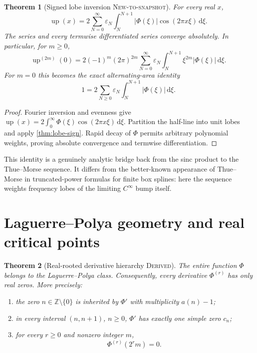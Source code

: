 \documentclass[11pt,oneside]{article}
\numberwithin{equation}{section}
\newtheorem{theorem}{Theorem}[section]
\theoremstyle{definition}
\theoremstyle{remark}
\newcommand{\Z}{\mathbb Z}
\newcommand{\dd}{\,\mathrm d}
\newcommand{\Up}{\operatorname{up}}
\newcommand{\Derived}{\textsc{Derived}}
\newcommand{\NewResult}{\textsc{New-to-snapshot}}
\begin{document}
\begin{theorem}[Signed lobe inversion \NewResult]
\label{thm:lobe-inversion}
For every real $x$,
\begin{equation}
 \Up(x)=2\sum_{N=0}^{\infty}\varepsilon_N
 \int_N^{N+1}|\Phi(\xi)|\cos(2\pi x\xi)\dd\xi.             \label{eq:lobe-inversion}
\end{equation}
The series and every termwise differentiated series converge absolutely.  In
particular, for $m\ge0$,
\begin{equation}
 \Up^{(2m)}(0)=2(-1)^m(2\pi)^{2m}
 \sum_{N=0}^{\infty}\varepsilon_N
 \int_N^{N+1}\xi^{2m}|\Phi(\xi)|\dd\xi.                  \label{eq:lobe-moments}
\end{equation}
For $m=0$ this becomes the exact alternating-area identity
\begin{equation}
 1=2\sum_{N\ge0}\varepsilon_N\int_N^{N+1}|\Phi(\xi)|\dd\xi.                \label{eq:area}
\end{equation}
\end{theorem}

\begin{proof}
Fourier inversion and evenness give
$\Up(x)=2\int_0^\infty\Phi(\xi)\cos(2\pi x\xi)\dd\xi$.
Partition the half-line into unit lobes and apply \cref{thm:lobe-sign}.
Rapid decay of $\Phi$ permits arbitrary polynomial weights, proving absolute
convergence and termwise differentiation.
\end{proof}

This identity is a genuinely analytic bridge back from the sinc product to the
Thue--Morse sequence.  It differs from the better-known appearance of
Thue--Morse in truncated-power formulas for finite box splines: here the sequence
weights frequency lobes of the limiting $C^\infty$ bump itself.

\section{Laguerre--Polya geometry and real critical points}
\label{sec:LP}

\begin{theorem}[Real-rooted derivative hierarchy \Derived]
\label{thm:LP}
The entire function $\Phi$ belongs to the Laguerre--Polya class.  Consequently,
every derivative $\Phi^{(r)}$ has only real zeros.  More precisely:
\begin{enumerate}
\item the zero $n\in\Z\setminus\{0\}$ is inherited by $\Phi'$ with multiplicity
      $a(n)-1$;
\item in every interval $(n,n+1)$, $n\ge0$, $\Phi'$ has exactly one simple zero
      $c_n$;
\item for every $r\ge0$ and nonzero integer $m$,
      \begin{equation}
       \Phi^{(r)}(2^r m)=0.                                \label{eq:derivative-lattice}
      \end{equation}
\end{enumerate}
\end{theorem}
\end{document}
